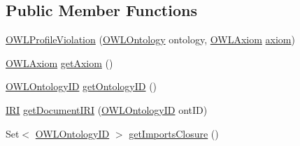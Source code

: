 \subsection*{Public Member Functions}
\begin{DoxyCompactItemize}
\item 
\hyperlink{classorg_1_1semanticweb_1_1owlapi_1_1profiles_1_1_o_w_l_profile_violation_a9e8794a51d9239ec3be0e935519862d6}{O\-W\-L\-Profile\-Violation} (\hyperlink{interfaceorg_1_1semanticweb_1_1owlapi_1_1model_1_1_o_w_l_ontology}{O\-W\-L\-Ontology} ontology, \hyperlink{interfaceorg_1_1semanticweb_1_1owlapi_1_1model_1_1_o_w_l_axiom}{O\-W\-L\-Axiom} \hyperlink{classorg_1_1semanticweb_1_1owlapi_1_1profiles_1_1_o_w_l_profile_violation_aa7c8e8910ed3966f64a2c003fb516214}{axiom})
\item 
\hyperlink{interfaceorg_1_1semanticweb_1_1owlapi_1_1model_1_1_o_w_l_axiom}{O\-W\-L\-Axiom} \hyperlink{classorg_1_1semanticweb_1_1owlapi_1_1profiles_1_1_o_w_l_profile_violation_a5c2b591c4b3a6b0cc140feb56cb60738}{get\-Axiom} ()
\item 
\hyperlink{classorg_1_1semanticweb_1_1owlapi_1_1model_1_1_o_w_l_ontology_i_d}{O\-W\-L\-Ontology\-I\-D} \hyperlink{classorg_1_1semanticweb_1_1owlapi_1_1profiles_1_1_o_w_l_profile_violation_a387a63d8c68131cc3cc3ef817319a0e2}{get\-Ontology\-I\-D} ()
\item 
\hyperlink{classorg_1_1semanticweb_1_1owlapi_1_1model_1_1_i_r_i}{I\-R\-I} \hyperlink{classorg_1_1semanticweb_1_1owlapi_1_1profiles_1_1_o_w_l_profile_violation_a361dec75bfcbda8a5173e64f0635f232}{get\-Document\-I\-R\-I} (\hyperlink{classorg_1_1semanticweb_1_1owlapi_1_1model_1_1_o_w_l_ontology_i_d}{O\-W\-L\-Ontology\-I\-D} ont\-I\-D)
\item 
Set$<$ \hyperlink{classorg_1_1semanticweb_1_1owlapi_1_1model_1_1_o_w_l_ontology_i_d}{O\-W\-L\-Ontology\-I\-D} $>$ \hyperlink{classorg_1_1semanticweb_1_1owlapi_1_1profiles_1_1_o_w_l_profile_violation_a25dde778316e426a1758c6a16391600c}{get\-Imports\-Closure} ()
\end{DoxyCompactItemize}
